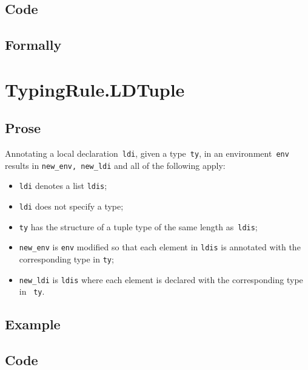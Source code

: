 \documentclass{book}
\begin{document}
  \subsection{Code}

\begin{emptyformal}
    \subsection{Formally}
\end{emptyformal}


\section{TypingRule.LDTuple \label{sec:TypingRule.LDTuple}}

  \subsection{Prose}
    Annotating a local declaration~\texttt{ldi}, given a type~\texttt{ty}, in
an environment~\texttt{env} results in \texttt{new\_env, new\_ldi} and all of
the following apply:
  \begin{itemize}
  \item \texttt{ldi} denotes a list \texttt{ldis};
  \item \texttt{ldi} does not specify a type;
  \item \texttt{ty} has the structure of a tuple type of the same length as~\texttt{ldis};
  \item \texttt{new\_env} is \texttt{env} modified so that each element in \texttt{ldis} is annotated with the corresponding type in \texttt{ty}; 
  \item \texttt{new\_ldi} is \texttt{ldis} where each element is declared with
the corresponding type in ~\texttt{ty}.
  \end{itemize} 

  \subsection{Example}

  \subsection{Code}
\end{document}
